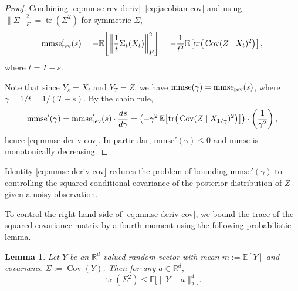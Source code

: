 \documentclass[11pt]{article}
\newtheorem{lemma}{Lemma}
\theoremstyle{definition}
\newcommand{\R}{\mathbb{R}}
\numberwithin{equation}{section}
\begin{document}
\begin{proof}
Combining \eqref{eq:mmse-rev-deriv}--\eqref{eq:jacobian-cov} and using
$\|\Sigma\|_F^2=\operatorname{tr}(\Sigma^2)$ for symmetric $\Sigma$,
\[
\mathrm{mmse}_{\rm rev}'(s)
=-\mathbb E\!\left[\left\|\frac{1}{t}\Sigma_t(X_t)\right\|_F^2\right]
=-\frac{1}{t^2}\mathbb E\!\left[\operatorname{tr}\!\big(\operatorname{Cov}(Z\mid X_t)^2\big)\right],
\]
where $t=T-s$.



Note that since $Y_s=X_t$ and $Y_T=Z$, we have $\mathrm{mmse}(\gamma)=\mathrm{mmse}_{\rm rev}(s)$, where $\gamma=1/t=1/(T-s)$. By the chain rule,
\[
\mathrm{mmse}'(\gamma)=\mathrm{mmse}_{\rm rev}'(s)\cdot\frac{ds}{d\gamma}
= \left(-\gamma^2\,\mathbb E\!\left[\operatorname{tr}\!\big(\operatorname{Cov}(Z\mid X_{1/\gamma})^2\big)\right]\right)\cdot\left(\frac{1}{\gamma^2}\right),
\]
hence \eqref{eq:mmse-deriv-cov}. 
In particular, $\mathrm{mmse}'(\gamma)\le 0$ and
$\mathrm{mmse}$ is monotonically decreasing.
\end{proof}



Identity \eqref{eq:mmse-deriv-cov} reduces the problem of bounding $\mathrm{mmse}'(\gamma)$ to controlling the squared conditional covariance of the posterior distribution of $Z$ given a noisy observation.

To control the right-hand side of \eqref{eq:mmse-deriv-cov}, we bound the trace of the squared covariance matrix by a fourth moment using the following probabilistic lemma. 


\begin{lemma}\label{lem:cov2-4th}
Let \(Y\) be an \(\R^d\)-valued random vector with mean \(m:=\mathbb E[Y]\) and covariance \(\Sigma:=\operatorname{Cov}(Y)\). Then for any \(a\in\R^d\),
\begin{equation*}\label{eq:cov2-4th-lemma}
\operatorname{tr}(\Sigma^2) \le \mathbb E\big[\|Y-a\|_2^4\big].
\end{equation*}
\end{lemma}
\end{document}
